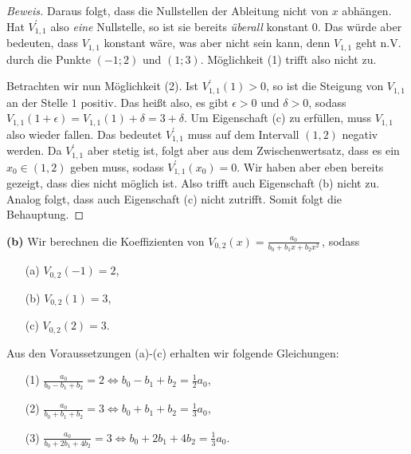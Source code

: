 \documentclass[10pt]{article}
\begin{document}
\begin{proof}[Beweis]
    Daraus folgt, dass die Nullstellen der Ableitung nicht von $x$ abhängen. Hat $V_{1,1}^\prime$ also \textit{eine} 
    Nullstelle, so ist sie bereits \textit{überall} konstant $0$. Das würde aber bedeuten, dass $V_{1,1}$ konstant wäre, was aber
    nicht sein kann, denn $V_{1,1}$ geht n.V. durch die Punkte $(-1; 2)$ und $(1; 3)$. Möglichkeit (1) trifft also nicht zu.\par
    Betrachten wir nun Möglichkeit (2). Ist $V_{1,1}^\prime(1) > 0$, so ist die Steigung von $V_{1,1}$ an der Stelle $1$ positiv.
    Das heißt also, es gibt $\epsilon>0$ und $\delta>0$, sodass $V_{1,1}(1+\epsilon) = V_{1,1}(1) + \delta = 3 + \delta$.
    Um Eigenschaft (c) zu erfüllen, muss $V_{1,1}$ also wieder fallen. Das bedeutet $V_{1,1}^\prime$ muss auf dem Intervall 
    $(1,2)$ negativ werden. Da $V_{1,1}^\prime$ aber stetig ist, folgt aber aus dem Zwischenwertsatz, dass es ein $x_0\in (1,2)$ geben muss, sodass 
    $V_{1,1}^\prime(x_0) = 0$. Wir haben aber eben bereits gezeigt, dass dies nicht möglich ist. Also trifft auch Eigenschaft (b) nicht zu.
    Analog folgt, dass auch Eigenschaft (c) nicht zutrifft. Somit folgt die Behauptung.
\end{proof}

\textbf{(b)} Wir berechnen die Koeffizienten von $V_{0,2}(x) = \frac{a_0}{b_0+b_1x+b_2x^2}$\,, sodass 
    \begin{itemize}
        \item[(a)] $V_{0,2}(-1) = 2$, 
        \item[(b)] $V_{0,2}(1) = 3$,
        \item[(c)] $V_{0,2}(2) = 3$. 
    \end{itemize}

    Aus den Voraussetzungen (a)-(c) erhalten wir folgende Gleichungen:
    \begin{itemize}
        \item[(1)] $\frac{a_0}{b_0-b_1+b_2} = 2  \Longleftrightarrow  b_0 - b_1 + b_2 = \frac{1}{2}a_0$,
        \item[(2)] $\frac{a_0}{b_0+b_1+b_2} = 3  \Longleftrightarrow  b_0 + b_1 + b_2 = \frac{1}{3}a_0$,
        \item[(3)] $\frac{a_0}{b_0+2b_1+4b_2} = 3 \Longleftrightarrow b_0 + 2b_1 + 4b_2 = \frac{1}{3}a_0$.  
    \end{itemize}
\end{document}
